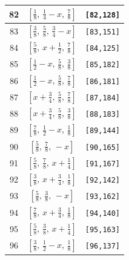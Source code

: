 \documentclass[fleqn,8pt]{jsarticle}
\begin{document}
\begin{longtable}{ccc}
82 & $\left[ \frac{1}{8},\, \frac{1}{4} - x,\, \frac{7}{8} \right]$ & {\tt [82,128]} \\ \hline
83 & $\left[ \frac{3}{8},\, \frac{5}{8},\, \frac{3}{4} - x \right]$ & {\tt [83,151]} \\ \hline
84 & $\left[ \frac{5}{8},\, x + \frac{1}{2},\, \frac{7}{8} \right]$ & {\tt [84,125]} \\ \hline
85 & $\left[ \frac{1}{2} - x,\, \frac{5}{8},\, \frac{3}{8} \right]$ & {\tt [85,182]} \\ \hline
86 & $\left[ \frac{1}{2} - x,\, \frac{5}{8},\, \frac{7}{8} \right]$ & {\tt [86,181]} \\ \hline
87 & $\left[ x + \frac{3}{4},\, \frac{5}{8},\, \frac{7}{8} \right]$ & {\tt [87,184]} \\ \hline
88 & $\left[ x + \frac{3}{4},\, \frac{5}{8},\, \frac{3}{8} \right]$ & {\tt [88,183]} \\ \hline
89 & $\left[ \frac{7}{8},\, \frac{1}{2} - x,\, \frac{1}{8} \right]$ & {\tt [89,144]} \\ \hline
90 & $\left[ \frac{5}{8},\, \frac{7}{8},\, - x \right]$ & {\tt [90,165]} \\ \hline
91 & $\left[ \frac{5}{8},\, \frac{7}{8},\, x + \frac{1}{4} \right]$ & {\tt [91,167]} \\ \hline
92 & $\left[ \frac{3}{8},\, x + \frac{3}{4},\, \frac{1}{8} \right]$ & {\tt [92,142]} \\ \hline
93 & $\left[ \frac{5}{8},\, \frac{3}{8},\, - x \right]$ & {\tt [93,162]} \\ \hline
94 & $\left[ \frac{7}{8},\, x + \frac{3}{4},\, \frac{1}{8} \right]$ & {\tt [94,140]} \\ \hline
95 & $\left[ \frac{5}{8},\, \frac{3}{8},\, x + \frac{1}{4} \right]$ & {\tt [95,163]} \\ \hline
96 & $\left[ \frac{3}{8},\, \frac{1}{2} - x,\, \frac{1}{8} \right]$ & {\tt [96,137]} \\
\end{longtable}
\renewcommand{\arraystretch}{1.2}
\end{document}
